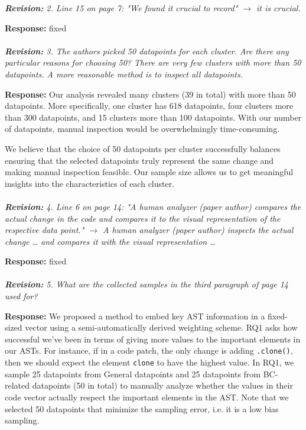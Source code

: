 \documentclass{article}
\begin{document}
\textit{\textbf{Revision:} 2. Line 15 on page 7: "We found it crucial to record" $\rightarrow$ it is crucial.}

\textbf{Response:} fixed \\ \\

\textit{\textbf{Revision:} 3. The authors picked 50 datapoints for each cluster. Are there any particular reasons for choosing 50? There are very few clusters with more than 50 datapoints. A more reasonable method is to inspect all datapoints.}

\textbf{Response:} Our analysis revealed many clusters (39 in total) with more than 50 datapoints. More specifically, one cluster has 618 datapoints, four clusters more than 300 datapoints, and 15 clusters more than 100 datapoints. With our number of datapoints, manual inspection would be overwhelmingly time-consuming.

We believe that the choice of 50 datapoints per cluster successfully balances ensuring that the selected datapoints truly represent the same change and making manual inspection feasible. Our sample size allows us to get meaningful insights into the characteristics of each cluster. \\ \\

\textit{\textbf{Revision:} 4. Line 6 on page 14: "A human analyzer (paper author) compares the actual change in the code and compares it to the visual representation of the respective data point." $\rightarrow$ A human analyzer (paper author) inspects the actual change … and compares it with the visual representation …}

\textbf{Response:} fixed \\ \\

\textit{\textbf{Revision:} 5. What are the collected samples in the third paragraph of page 14 used for?}

\textbf{Response:} We proposed a method to embed key AST information in a fixed-sized vector using a semi-automatically derived weighting scheme. RQ1 asks how successful we've been in terms of giving more values to the important elements in our ASTs. For instance, if in a code patch, the only change is adding \verb+.clone()+, then we should expect the element \verb+clone+ to have the highest value. In RQ1, we sample 25 datapoints from General datapoints and 25 datapoints from BC-related datapoints (50 in total) to manually analyze whether the values in their code vector actually respect the important elements in the AST. Note that we selected 50 datapoints that minimize the sampling error, i.e. it is a low bias sampling. \\ \\
\end{document}
